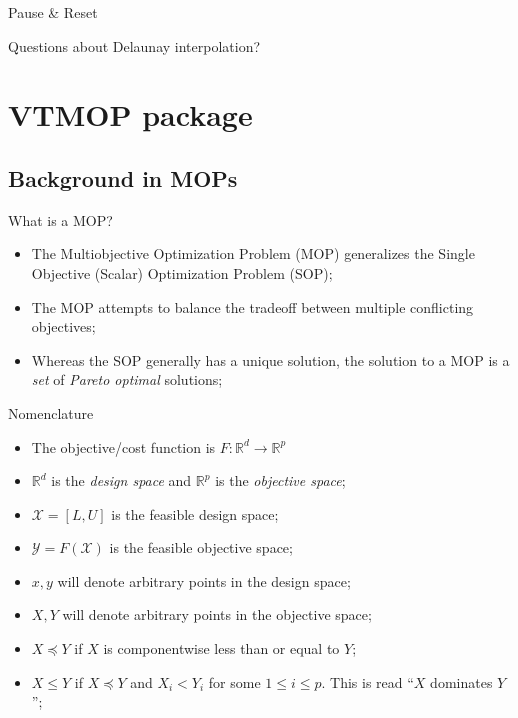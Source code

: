 \documentclass[xcolor=dvipsnames]{beamer}
\begin{document}
\begin{frame}{Pause \& Reset}
\begin{center}
{\huge
Questions about Delaunay interpolation?
}
\end{center}
\end{frame}

\section{VTMOP package}
\subsection{Background in MOPs}
\begin{frame}{What is a MOP?}
\begin{itemize}
\item The Multiobjective Optimization Problem (MOP) generalizes the Single
Objective (Scalar) Optimization Problem (SOP);
\item The MOP attempts to balance the tradeoff between multiple conflicting
objectives;
\item Whereas the SOP generally has a unique solution, the solution to a MOP
is a {\it set} of {\it Pareto optimal} solutions;
\end{itemize}
\end{frame}
\begin{frame}{Nomenclature}
\begin{itemize}
\item The objective/cost function is $F : \mathbb{R}^d\rightarrow\mathbb{R}^p$
\item $\mathbb{R}^d$ is the {\it design space} and
$\mathbb{R}^p$ is the {\it objective space};
\item $\mathcal{X} = [L,U]$ is the feasible design space;
\item $\mathcal{Y} = F(\mathcal{X})$ is the feasible objective space;
\item $x,y$ will denote arbitrary points in the design space;
\item $X,Y$ will denote arbitrary points in the objective space;
\item $X \preceq Y$ if $X$ is componentwise less than or equal to $Y$;
\item $X \leq Y$ if $X \preceq Y$ and $X_i < Y_i$ for some $1\leq i \leq p$. This is read ``$X$ dominates $Y$'';
\end{itemize}
\end{frame}
\end{document}
